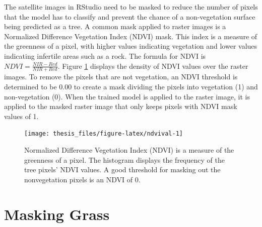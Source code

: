 \documentclass[12pt,twoside]{reedthesis}
\begin{document}
The satellite images in RStudio need to be masked to reduce the number of pixels that the model has to classify and prevent the chance of a non-vegetation surface being predicted as a tree. A common mask applied to raster images is a Normalized Difference Vegetation Index (NDVI) mask. This index is a measure of the greenness of a pixel, with higher values indicating vegetation and lower values indicating infertile areas such as a rock. The formula for NDVI is \(NDVI = \frac{NIR - Red}{NIR + Red}\). Figure \ref{fig:ndvival} displays the density of NDVI values over the raster images. To remove the pixels that are not vegetation, an NDVI threshold is determined to be 0.00 to create a mask dividing the pixels into vegetation (1) and non-vegetation (0). When the trained model is applied to the raster image, it is applied to the masked raster image that only keeps pixels with NDVI mask values of 1.
\begin{figure}

{\centering \texttt{[image: thesis\_files/figure-latex/ndvival-1]} 

}

\caption{Normalized Difference Vegetation Index (NDVI) is a measure of the greenness of a pixel. The histogram displays the frequency of the tree pixels' NDVI values. A good threshold for masking out the nonvegetation pixels is an NDVI of 0.}\label{fig:ndvival}
\end{figure}
\hypertarget{masking-grass}{%
\section{Masking Grass}\label{masking-grass}}
\end{document}
